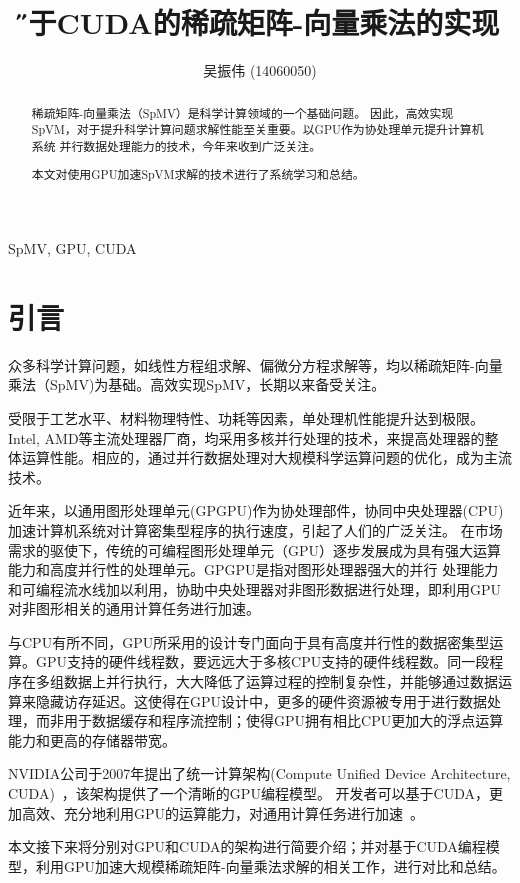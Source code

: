 \documentclass[11pt,twocolumn]{article}
\title{\H 基于CUDA的稀疏矩阵-向量乘法的实现}
\author{吴振伟 (14060050)}
\date{}
\begin{document}
\maketitle

\renewcommand\abstractname{摘 要}
\begin{abstract}
稀疏矩阵-向量乘法（SpMV）是科学计算领域的一个基础问题。
因此，高效实现SpVM，对于提升科学计算问题求解性能至关重要。以GPU作为协处理单元提升计算机系统
并行数据处理能力的技术，今年来收到广泛关注。

本文对使用GPU加速SpVM求解的技术进行了系统学习和总结。\\
\end{abstract}

 SpMV, GPU, CUDA

\section{引言}
众多科学计算问题，如线性方程组求解、偏微分方程求解等，均以稀疏矩阵-向量乘法（SpMV)为基础。高效实现SpMV，长期以来备受关注。

受限于工艺水平、材料物理特性、功耗等因素，单处理机性能提升达到极限。Intel, AMD等主流处理器厂商，均采用多核并行处理的技术，来提高处理器的整体运算性能。相应的，通过并行数据处理对大规模科学运算问题的优化，成为主流技术。

近年来，以通用图形处理单元(GPGPU)作为协处理部件，协同中央处理器(CPU)加速计算机系统对计算密集型程序的执行速度，引起了人们的广泛关注。
在市场需求的驱使下，传统的可编程图形处理单元（GPU）逐步发展成为具有强大运算能力和高度并行性的处理单元。GPGPU是指对图形处理器强大的并行
处理能力和可编程流水线加以利用，协助中央处理器对非图形数据进行处理，即利用GPU对非图形相关的通用计算任务进行加速。

与CPU有所不同，GPU所采用的设计专门面向于具有高度并行性的数据密集型运算。GPU支持的硬件线程数，要远远大于多核CPU支持的硬件线程数。同一段程序在多组数据上并行执行，大大降低了运算过程的控制复杂性，并能够通过数据运算来隐藏访存延迟。这使得在GPU设计中，更多的硬件资源被专用于进行数据处理，而非用于数据缓存和程序流控制；使得GPU拥有相比CPU更加大的浮点运算能力和更高的存储器带宽。

NVIDIA公司于2007年提出了统一计算架构(Compute Unified Device Architecture, CUDA)~\cite{Nickolls:2008:SPP:1365490.1365500}，该架构提供了一个清晰的GPU编程模型。
开发者可以基于CUDA，更加高效、充分地利用GPU的运算能力，对通用计算任务进行加速~\cite{Applications}。

本文接下来将分别对GPU和CUDA的架构进行简要介绍；并对基于CUDA编程模型，利用GPU加速大规模稀疏矩阵-向量乘法求解的相关工作，进行对比和总结。
\end{document}

